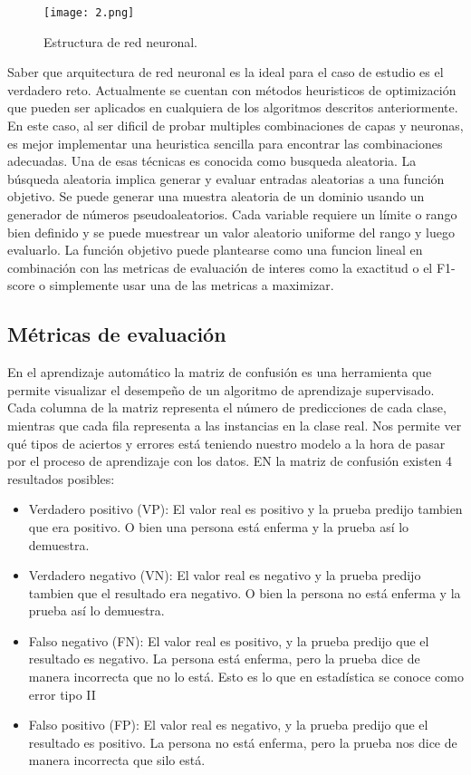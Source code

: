 \documentclass[conference]{IEEEtran}
\begin{document}
\begin{figure}[h]
    \centering
    \texttt{[image: 2.png]}
    \caption{Estructura de red neuronal.}
    \label{fig:mesh1}
\end{figure}

Saber que arquitectura de red neuronal es la ideal para el caso de estudio es el verdadero reto. Actualmente se cuentan con métodos heuristicos de optimización que pueden ser aplicados en cualquiera de los algoritmos descritos anteriormente. En este caso, al ser dificil de probar multiples combinaciones de capas y neuronas, es mejor implementar una heuristica sencilla para encontrar las combinaciones adecuadas. Una de esas técnicas es conocida como busqueda aleatoria. La búsqueda aleatoria implica generar y evaluar entradas aleatorias a una función objetivo. Se puede generar una muestra aleatoria de un dominio usando un generador de números pseudoaleatorios. Cada variable requiere un límite o rango bien definido y se puede muestrear un valor aleatorio uniforme del rango y luego evaluarlo. La función objetivo puede plantearse como una funcion lineal en combinación con las metricas de evaluación de interes como la exactitud o el F1-score o simplemente usar una de las metricas a maximizar. 

\subsection{Métricas de evaluación}
En el aprendizaje automático la matriz de confusión es una herramienta que permite visualizar el desempeño de un algoritmo  de aprendizaje supervisado. Cada columna de la matriz representa el número de predicciones de cada clase, mientras que cada fila representa a las instancias en la clase real. Nos permite ver  qué tipos de aciertos y errores está teniendo nuestro modelo a la hora de pasar por el proceso de aprendizaje con los datos. EN la matriz de confusión existen 4 resultados posibles: 

\begin{itemize}
\item Verdadero positivo (VP): El valor real es positivo y  la prueba predijo tambien que era positivo. O bien una persona está enferma y la prueba así lo demuestra.
\item Verdadero negativo (VN): El valor real  es negativo y la prueba predijo tambien que el resultado era negativo. O bien la persona no está enferma y la prueba así lo  demuestra.
\item Falso negativo (FN): El valor real es positivo, y la prueba predijo  que el resultado es negativo. La persona está enferma, pero la prueba dice de manera incorrecta que no lo está. Esto es lo que en estadística se conoce como error tipo II
\item Falso positivo (FP): El valor real es negativo, y la prueba predijo  que el resultado es positivo. La persona no está enferma, pero la prueba nos dice de manera incorrecta que silo está.
\end{itemize}
\end{document}
